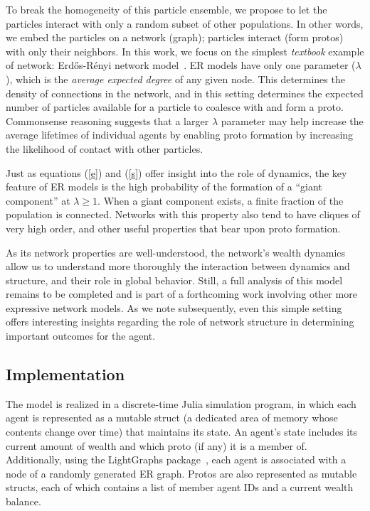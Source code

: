 To break the homogeneity of this particle ensemble, we propose to let the particles interact with only a random subset of other populations. In other words, we embed the particles on a network (graph); particles interact (form protos) with only their neighbors. In this work, we focus on the simplest \textit{textbook} example of network: Erd\H{o}s-R\'{e}nyi network model~\cite{newman2018networks}. ER models have only one parameter ($\lambda$), which is the \textit{average expected degree} of any given node. This determines the density of connections in the network, and in this setting determines the expected number of particles available for a particle to coalesce with and form a proto. Commonsense reasoning suggests that a larger $\lambda$ parameter may help increase the average lifetimes of individual agents by enabling proto formation by increasing the likelihood of contact with other particles. 

Just as equations (\ref{e}) and (\ref{s}) offer insight into the role of dynamics, the key feature of ER models is the high probability of the formation of a ``giant component'' at $\lambda \ge 1$. When a giant component exists, a finite fraction of the population is connected. Networks with this property also tend to have cliques of very high order, and other useful properties that bear upon proto formation.

As its network properties are well-understood, the network's wealth dynamics allow us to understand more thoroughly the interaction between dynamics and structure, and their role in global behavior. Still, a full analysis of this model remains to be completed and is part of a forthcoming work involving other more expressive network models. As we note subsequently, even this simple setting offers interesting insights regarding the role of network structure in determining important outcomes for the agent. 


\subsection{Implementation}


The model is realized in a discrete-time Julia simulation program, in which each agent is represented as a mutable struct (a dedicated area of memory whose contents change over time) that maintains its state. An agent's state includes its current amount of wealth and which proto (if any) it is a member of. Additionally, using the LightGraphs package~\cite{LightGraphs-2017}, each agent is associated with a node of a randomly generated ER graph. Protos are also represented as mutable structs, each of which contains a list of member agent IDs and a current wealth balance.

